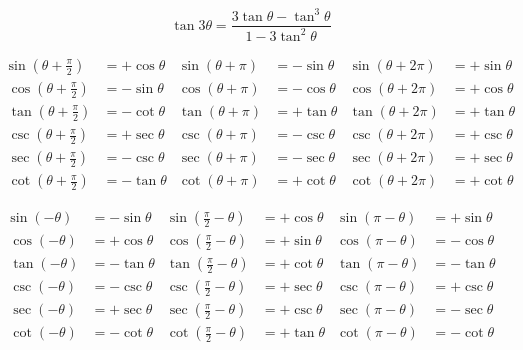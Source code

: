 \[\begin{equation} \tan 3\theta = \frac{3 \tan\theta - \tan^3\theta}{1 - 3 \tan^2\theta} \end{equation}\]

\[\begin{align} \sin(\theta + \tfrac{\pi}{2}) &= +\cos \theta & \sin(\theta + \pi) &= -\sin \theta & \sin(\theta + 2\pi) &= +\sin \theta \\\ \cos(\theta + \tfrac{\pi}{2}) &= -\sin \theta & \cos(\theta + \pi) &= -\cos \theta & \cos(\theta + 2\pi) &= +\cos \theta \\\ \tan(\theta + \tfrac{\pi}{2}) &= -\cot \theta & \tan(\theta + \pi) &= +\tan \theta & \tan(\theta + 2\pi) &= +\tan \theta \\\ \csc(\theta + \tfrac{\pi}{2}) &= +\sec \theta & \csc(\theta + \pi) &= -\csc \theta & \csc(\theta + 2\pi) &= +\csc \theta \\\ \sec(\theta + \tfrac{\pi}{2}) &= -\csc \theta & \sec(\theta + \pi) &= -\sec \theta & \sec(\theta + 2\pi) &= +\sec \theta \\\ \cot(\theta + \tfrac{\pi}{2}) &= -\tan \theta & \cot(\theta + \pi) &= +\cot \theta & \cot(\theta + 2\pi) &= +\cot \theta \end{align}\]

\[\begin{align} \sin(-\theta) &= -\sin \theta & \sin(\tfrac{\pi}{2} - \theta) &= +\cos \theta & \sin(\pi - \theta) &= +\sin \theta \\\ \cos(-\theta) &= +\cos \theta & \cos(\tfrac{\pi}{2} - \theta) &= +\sin \theta & \cos(\pi - \theta) &= -\cos \theta \\\ \tan(-\theta) &= -\tan \theta & \tan(\tfrac{\pi}{2} - \theta) &= +\cot \theta & \tan(\pi - \theta) &= -\tan \theta \\\ \csc(-\theta) &= -\csc \theta & \csc(\tfrac{\pi}{2} - \theta) &= +\sec \theta & \csc(\pi - \theta) &= +\csc \theta \\\ \sec(-\theta) &= +\sec \theta & \sec(\tfrac{\pi}{2} - \theta) &= +\csc \theta & \sec(\pi - \theta) &= -\sec \theta \\\ \cot(-\theta) &= -\cot \theta & \cot(\tfrac{\pi}{2} - \theta) &= +\tan \theta & \cot(\pi - \theta) &= -\cot \theta \end{align}\]
